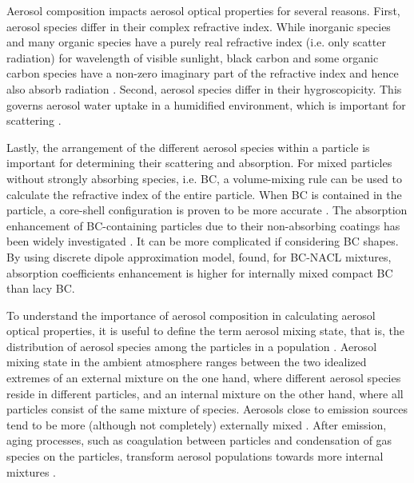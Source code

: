 \documentclass[edeposit,fullpage]{uiucthesis2009}
\begin{document}
Aerosol composition impacts aerosol optical properties for several
reasons. First, aerosol species differ in their complex refractive
index. While inorganic species and many organic species have a purely
real refractive index (i.e. only scatter radiation) for wavelength of
visible sunlight, black carbon and some organic carbon species have a
non-zero imaginary part of the refractive index and hence also absorb
radiation \citep{corbin2018brown, Esteve2014, cappa2019light}.
Second, aerosol species differ in their hygroscopicity. This governs
aerosol water uptake in a humidified environment, which is important
for scattering \citep{MichelFlores2012, Zieger2013, Titos2014,
  Titos2016}.

Lastly, the arrangement of the different aerosol species within a
particle is important for determining their scattering and
absorption. For mixed particles without strongly absorbing species,
i.e. BC, a volume-mixing rule can be used to calculate the refractive
index of the entire particle. When BC is contained in the particle, a
core-shell configuration is proven to be more accurate
\citep{Bond2006}. The absorption enhancement of BC-containing
particles due to their non-absorbing coatings has been widely
investigated \citep{Moffet2009,Liu2017,wu2020light, Fierce2020}. It can be 
more complicated if considering BC shapes. By using discrete dipole approximation
model, \citet{scarnato2013effects} found, for BC-NACL mixtures, absorption coefficients 
enhancement is higher for internally mixed compact BC than lacy BC.

To understand the importance of aerosol composition in calculating
aerosol optical properties, it is useful to define the term aerosol
mixing state, that is, the distribution of aerosol species among the
particles in a population \citep{Riemer2009,Riemer2013a}. Aerosol
mixing state in the ambient atmosphere ranges between the two
idealized extremes of an external mixture on the one hand, where
different aerosol species reside in different particles, and an
internal mixture on the other hand, where all particles consist of the
same mixture of species. Aerosols close to emission sources tend to be
more (although not completely) externally mixed \citep{Bondy2018,
  Rissler2014}. After emission, aging processes, such as coagulation
between particles and condensation of gas species on the particles,
transform aerosol populations towards more internal mixtures
\citep{Healy2014, Liu2013, Zaveri2010a}.
\end{document}
